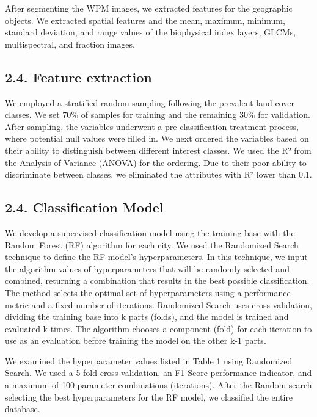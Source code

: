 \documentclass[preprint, 3p,
authoryear]{elsarticle} %
\begin{document}
After segmenting the WPM images, we extracted features for the
geographic objects. We extracted spatial features and the mean, maximum,
minimum, standard deviation, and range values of the biophysical index
layers, GLCMs, multispectral, and fraction images.

\hypertarget{feature-extraction}{%
\subsection{2.4. Feature extraction}\label{feature-extraction}}

We employed a stratified random sampling following the prevalent land
cover classes. We set 70\% of samples for training and the remaining
30\% for validation. After sampling, the variables underwent a
pre-classification treatment process, where potential null values were
filled in. We next ordered the variables based on their ability to
distinguish between different interest classes. We used the R² from the
Analysis of Variance (ANOVA) for the ordering. Due to their poor ability
to discriminate between classes, we eliminated the attributes with R²
lower than 0.1.

\hypertarget{classification-model}{%
\subsection{2.4. Classification Model}\label{classification-model}}

We develop a supervised classification model using the training base
with the Random Forest (RF) algorithm for each city. We used the
Randomized Search technique to define the RF model's hyperparameters. In
this technique, we input the algorithm values of hyperparameters that
will be randomly selected and combined, returning a combination that
results in the best possible classification. The method selects the
optimal set of hyperparameters using a performance metric and a fixed
number of iterations. Randomized Search uses cross-validation, dividing
the training base into k parts (folds), and the model is trained and
evaluated k times. The algorithm chooses a component (fold) for each
iteration to use as an evaluation before training the model on the other
k-1 parts.

We examined the hyperparameter values listed in Table 1 using Randomized
Search. We used a 5-fold cross-validation, an F1-Score performance
indicator, and a maximum of 100 parameter combinations (iterations).
After the Random-search selecting the best hyperparameters for the RF
model, we classified the entire database.
\end{document}
